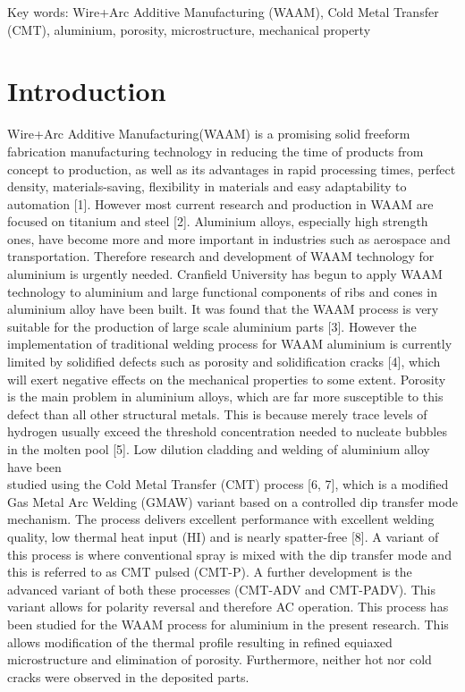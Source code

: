 \documentclass[10pt]{article}
\begin{document}
Key words: Wire+Arc Additive Manufacturing (WAAM), Cold Metal Transfer (CMT), aluminium, porosity, microstructure, mechanical property

\section*{Introduction}
Wire+Arc Additive Manufacturing(WAAM) is a promising solid freeform fabrication manufacturing technology in reducing the time of products from concept to production, as well as its advantages in rapid processing times, perfect density, materials-saving, flexibility in materials and easy adaptability to automation [1]. However most current research and production in WAAM are focused on titanium and steel [2]. Aluminium alloys, especially high strength ones, have become more and more important in industries such as aerospace and transportation. Therefore research and development of WAAM technology for aluminium is urgently needed. Cranfield University has begun to apply WAAM technology to aluminium and large functional components of ribs and cones in aluminium alloy have been built. It was found that the WAAM process is very suitable for the production of large scale aluminium parts [3]. However the implementation of traditional welding process for WAAM aluminium is currently limited by solidified defects such as porosity and solidification cracks [4], which will exert negative effects on the mechanical properties to some extent. Porosity is the main problem in aluminium alloys, which are far more susceptible to this defect than all other structural metals. This is because merely trace levels of hydrogen usually exceed the threshold concentration needed to nucleate bubbles in the molten pool [5]. Low dilution cladding and welding of aluminium alloy have been\\
studied using the Cold Metal Transfer (CMT) process [6, 7], which is a modified Gas Metal Arc Welding (GMAW) variant based on a controlled dip transfer mode mechanism. The process delivers excellent performance with excellent welding quality, low thermal heat input (HI) and is nearly spatter-free [8]. A variant of this process is where conventional spray is mixed with the dip transfer mode and this is referred to as CMT pulsed (CMT-P). A further development is the advanced variant of both these processes (CMT-ADV and CMT-PADV). This variant allows for polarity reversal and therefore AC operation. This process has been studied for the WAAM process for aluminium in the present research. This allows modification of the thermal profile resulting in refined equiaxed microstructure and elimination of porosity. Furthermore, neither hot nor cold cracks were observed in the deposited parts.
\end{document}
